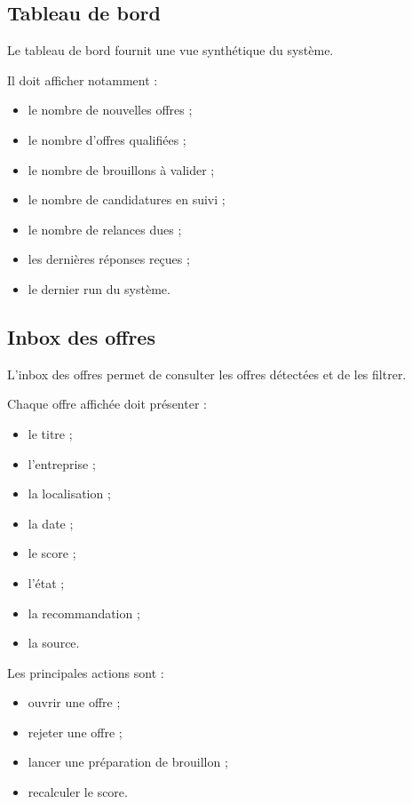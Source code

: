 \documentclass[11pt,a4paper]{article}
\begin{document}
\subsection{Tableau de bord}

Le tableau de bord fournit une vue synthétique du système.

Il doit afficher notamment :

\begin{itemize}
    \item le nombre de nouvelles offres ;
    \item le nombre d’offres qualifiées ;
    \item le nombre de brouillons à valider ;
    \item le nombre de candidatures en suivi ;
    \item le nombre de relances dues ;
    \item les dernières réponses reçues ;
    \item le dernier run du système.
\end{itemize}

\subsection{Inbox des offres}

L’inbox des offres permet de consulter les offres détectées et de les filtrer.

Chaque offre affichée doit présenter :

\begin{itemize}
    \item le titre ;
    \item l’entreprise ;
    \item la localisation ;
    \item la date ;
    \item le score ;
    \item l’état ;
    \item la recommandation ;
    \item la source.
\end{itemize}

Les principales actions sont :

\begin{itemize}
    \item ouvrir une offre ;
    \item rejeter une offre ;
    \item lancer une préparation de brouillon ;
    \item recalculer le score.
\end{itemize}
\end{document}
